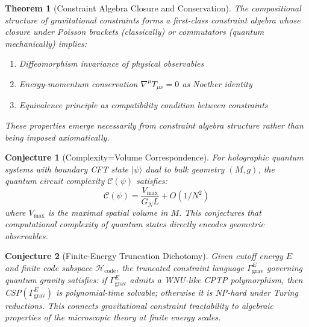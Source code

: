 \documentclass[11pt,a4paper]{article}
\newtheorem{theorem}{Theorem}[section]
\newtheorem{conjecture}{Conjecture}[section]
\theoremstyle{remark}
\theoremstyle{definition}
\begin{document}
\begin{theorem}[Constraint Algebra Closure and Conservation]
\label{thm:constraint_closure}
The compositional structure of gravitational constraints forms a first-class constraint algebra whose closure under Poisson brackets (classically) or commutators (quantum mechanically) implies:
\begin{enumerate}[label=(\roman*)]
\item Diffeomorphism invariance of physical observables
\item Energy-momentum conservation $\nabla^\mu T_{\mu\nu} = 0$ as Noether identity
\item Equivalence principle as compatibility condition between constraints
\end{enumerate}
These properties emerge necessarily from constraint algebra structure rather than being imposed axiomatically.
\end{theorem}

\begin{conjecture}[Complexity=Volume Correspondence]
\label{conj:complexity_geometry}
For holographic quantum systems with boundary CFT state $|\psi\rangle$ dual to bulk geometry $(M, g)$, the quantum circuit complexity $\mathcal{C}(\psi)$ satisfies:
\begin{equation}
\mathcal{C}(\psi) = \frac{V_{\text{max}}}{G_N L} + O(1/N^2)
\end{equation}
where $V_{\text{max}}$ is the maximal spatial volume in $M$. This conjectures that computational complexity of quantum states directly encodes geometric observables.
\end{conjecture}

\begin{conjecture}[Finite-Energy Truncation Dichotomy]
\label{conj:csp_dichotomy}
Given cutoff energy $E$ and finite code subspace $\mathcal{H}_{\text{code}}$, the truncated constraint language $\Gamma^E_{\text{grav}}$ governing quantum gravity satisfies:
if $\Gamma^E_{\text{grav}}$ admits a WNU-like CPTP polymorphism, then CSP$(\Gamma^E_{\text{grav}})$ is polynomial-time solvable; otherwise it is NP-hard under Turing reductions. This connects gravitational constraint tractability to algebraic properties of the microscopic theory at finite energy scales.
\end{conjecture}
\end{document}
